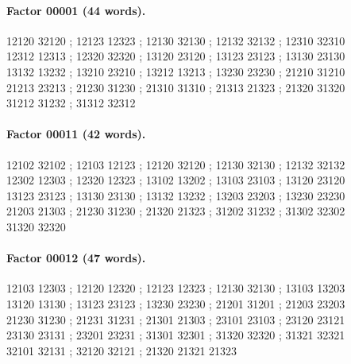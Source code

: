 \documentclass[11pt]{article}
\theoremstyle{remark}
\numberwithin{equation}{section}
\begin{document}
\paragraph{Factor 00001 (44 words).}
\begingroup\small\ttfamily\begin{flushleft}
12120 32120 ; 12123 12323 ; 12130 32130 ; 12132 32132 ; 12310 32310\\
12312 12313 ; 12320 32320 ; 13120 23120 ; 13123 23123 ; 13130 23130\\
13132 13232 ; 13210 23210 ; 13212 13213 ; 13230 23230 ; 21210 31210\\
21213 23213 ; 21230 31230 ; 21310 31310 ; 21313 21323 ; 21320 31320\\
31212 31232 ; 31312 32312\\
\end{flushleft}\endgroup
\paragraph{Factor 00011 (42 words).}
\begingroup\small\ttfamily\begin{flushleft}
12102 32102 ; 12103 12123 ; 12120 32120 ; 12130 32130 ; 12132 32132\\
12302 12303 ; 12320 12323 ; 13102 13202 ; 13103 23103 ; 13120 23120\\
13123 23123 ; 13130 23130 ; 13132 13232 ; 13203 23203 ; 13230 23230\\
21203 21303 ; 21230 31230 ; 21320 21323 ; 31202 31232 ; 31302 32302\\
31320 32320\\
\end{flushleft}\endgroup
\paragraph{Factor 00012 (47 words).}
\begingroup\small\ttfamily\begin{flushleft}
12103 12303 ; 12120 12320 ; 12123 12323 ; 12130 32130 ; 13103 13203\\
13120 13130 ; 13123 23123 ; 13230 23230 ; 21201 31201 ; 21203 23203\\
21230 31230 ; 21231 31231 ; 21301 21303 ; 23101 23103 ; 23120 23121\\
23130 23131 ; 23201 23231 ; 31301 32301 ; 31320 32320 ; 31321 32321\\
32101 32131 ; 32120 32121 ; 21320 21321 21323\\
\end{flushleft}\endgroup
\end{document}
